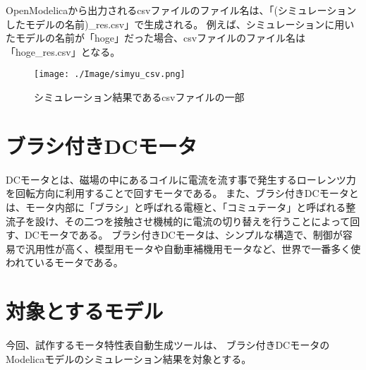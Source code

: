 OpenModelicaから出力されるcsvファイルのファイル名は、「(シミュレーションしたモデルの名前)\_res.csv」で生成される。
例えば、シミュレーションに用いたモデルの名前が「hoge」だった場合、csvファイルのファイル名は「hoge\_res.csv」となる。
\begin{figure}[t]
	\centering
	\texttt{[image: ./Image/simyu\_csv.png]}
	\caption{シミュレーション結果であるcsvファイルの一部}
	\label{fig:simyu_csv}
\end{figure}
\section{ブラシ付きDCモータ}\label{bDCmotor}
DCモータとは、磁場の中にあるコイルに電流を流す事で発生するローレンツ力を回転方向に利用することで回すモータである\cite{モータ原理}。
また、ブラシ付きDCモータとは、モータ内部に「ブラシ」と呼ばれる電極と、「コミュテータ」と呼ばれる整流子を設け、その二つを接触させ機械的に電流の切り替えを行うことによって回す、DCモータである。
ブラシ付きDCモータは、シンプルな構造で、制御が容易で汎用性が高く、模型用モータや自動車補機用モータなど、世界で一番多く使われているモータである\cite{モータ使う}。
\section{対象とするモデル}\label{taioumodel}
今回、試作するモータ特性表自動生成ツールは、%
ブラシ付きDCモータのModelicaモデルのシミュレーション結果を対象とする。

